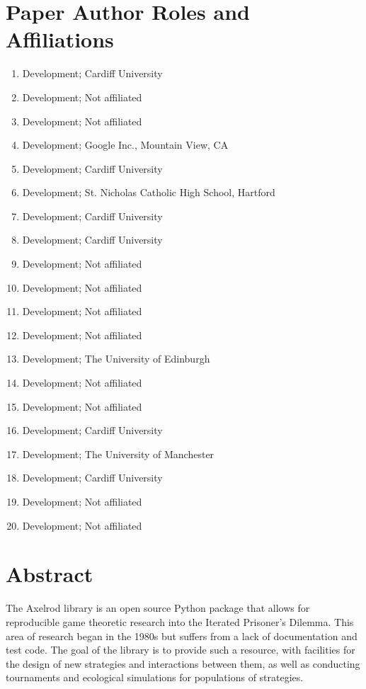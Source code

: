 \documentclass{jors}
\begin{document}
\section*{Paper Author Roles and Affiliations}


\begin{multicols}{2}
    \begin{enumerate}[noitemsep,topsep=0pt]
\item Development; Cardiff University
\item Development; Not affiliated
\item Development; Not affiliated
\item Development; Google Inc., Mountain View, CA
\item Development; Cardiff University
\item Development; St. Nicholas Catholic High School, Hartford
\item Development; Cardiff University
\item Development; Cardiff University
\item Development; Not affiliated
\item Development; Not affiliated
\item Development; Not affiliated
\item Development; Not affiliated
\item Development; The University of Edinburgh
\item Development; Not affiliated
\item Development; Not affiliated
\item Development; Cardiff University
\item Development; The University of Manchester
\item Development; Cardiff University
\item Development; Not affiliated
\item Development; Not affiliated
    \end{enumerate}
\end{multicols}

\section*{Abstract}

The Axelrod library is an open source Python package that allows for
reproducible game theoretic research into the Iterated Prisoner's Dilemma.
This area of research began in the 1980s but suffers from a lack of
documentation and test code. The goal of the library is to provide such
a resource, with facilities for the design of new strategies and
interactions between them, as well as conducting tournaments and ecological
simulations for populations of strategies.
\end{document}
